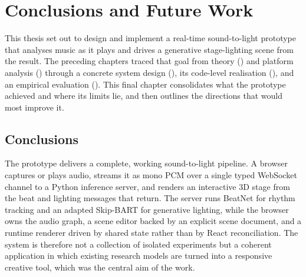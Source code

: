 \chapter{Conclusions and Future Work}
\label{conclusions}

This thesis set out to design and implement a real-time sound-to-light prototype that analyses music as it plays and drives a generative stage-lighting scene from the result. The preceding chapters traced that goal from theory () and platform analysis () through a concrete system design (), its code-level realisation (), and an empirical evaluation (). This final chapter consolidates what the prototype achieved and where its limits lie, and then outlines the directions that would most improve it.

\section{Conclusions}

The prototype delivers a complete, working sound-to-light pipeline. A browser captures or plays audio, streams it as mono PCM over a single typed WebSocket channel to a Python inference server, and renders an interactive 3D stage from the beat and lighting messages that return. The server runs BeatNet for rhythm tracking and an adapted Skip-BART for generative lighting, while the browser owns the audio graph, a scene editor backed by an explicit scene document, and a runtime renderer driven by shared state rather than by React reconciliation. The system is therefore not a collection of isolated experiments but a coherent application in which existing research models are turned into a responsive creative tool, which was the central aim of the work.

